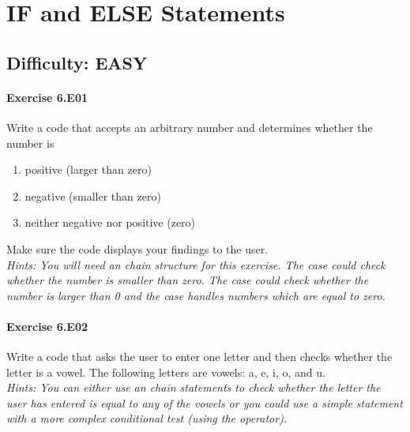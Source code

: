 \chapter{IF and ELSE Statements}\label{CHAP_IfAndElse}

\section{Difficulty: EASY}

\subsubsection*{Exercise 6.E01}
Write a code that accepts an arbitrary number and determines whether the number is
\begin{enumerate}[label=(\alph*)]
	\item positive (larger than zero)
	\item negative (smaller than zero)
	\item neither negative nor positive (zero)
\end{enumerate}
Make sure the code displays your findings to the user.\\


\textit{Hints:
You will need an {} chain structure for this exercise. The {} case could check whether the number is smaller than zero. The {} case could check whether the number is larger than 0 and the {} case handles numbers which are equal to zero.}\\[1cm]




\subsubsection*{Exercise 6.E02}
Write a code that asks the user to enter one letter and then checks whether the letter is a
vowel. The following letters are vowels: a, e, i, o, and u.\\


\textit{Hints:
You can either use an {} chain statements to check whether the letter the user has entered is equal to any of the vowels or you could use a simple {} statement with a more complex conditional test (using the {} operator).}\\[1cm]



